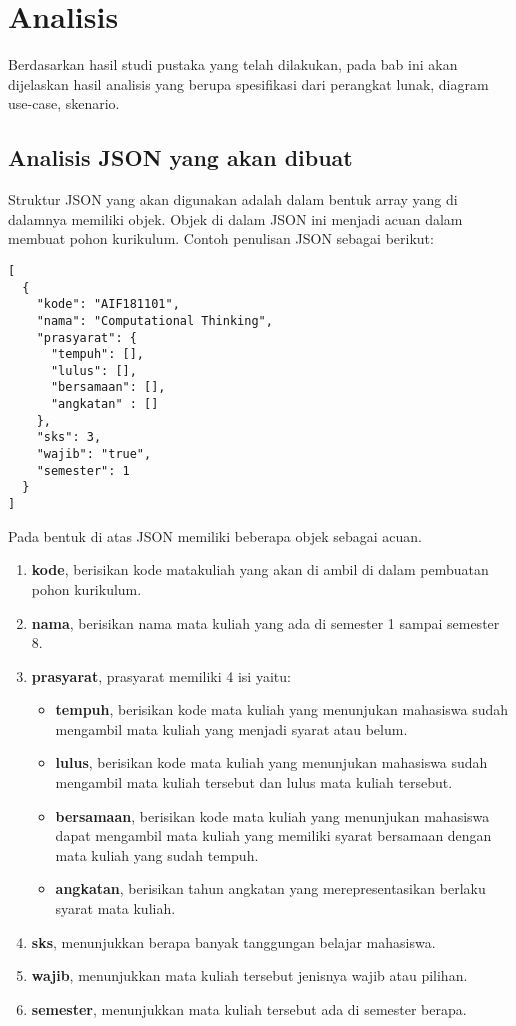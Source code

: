 \chapter{Analisis}
\label{chap: Analsisis}

Berdasarkan hasil studi pustaka yang telah dilakukan, pada bab ini akan dijelaskan hasil analisis
yang berupa spesifikasi dari perangkat lunak, diagram use-case, skenario.

\section{Analisis JSON yang akan dibuat}
\label{sec: Analisis JSON yang akan dibuat}

Struktur JSON yang akan digunakan adalah dalam bentuk array yang di dalamnya memiliki objek.  
Objek di dalam JSON ini menjadi acuan dalam membuat pohon kurikulum. Contoh penulisan JSON sebagai berikut:

\begin{lstlisting}
[
  {
    "kode": "AIF181101",
    "nama": "Computational Thinking",
    "prasyarat": {
      "tempuh": [],
      "lulus": [],
      "bersamaan": [],
      "angkatan" : []
    },
    "sks": 3,
    "wajib": "true",
    "semester": 1
  }
]
\end{lstlisting}

Pada bentuk di atas JSON memiliki beberapa objek sebagai acuan.
\begin{enumerate}
\item \textbf{kode}, berisikan kode matakuliah yang akan di ambil di dalam pembuatan pohon kurikulum.
\item \textbf{nama}, berisikan nama mata kuliah yang ada di semester 1 sampai semester 8.
\item \textbf{prasyarat}, prasyarat memiliki 4 isi yaitu:
\begin{itemize}
\item \textbf{tempuh}, berisikan kode mata kuliah yang menunjukan mahasiswa sudah mengambil mata kuliah yang menjadi syarat atau belum. 
\item \textbf{lulus}, berisikan kode mata kuliah yang menunjukan mahasiswa sudah mengambil mata kuliah tersebut dan lulus mata kuliah tersebut.
\item \textbf{bersamaan}, berisikan kode mata kuliah yang menunjukan mahasiswa dapat mengambil mata kuliah yang memiliki syarat bersamaan dengan mata kuliah yang sudah tempuh.
\item \textbf{angkatan}, berisikan tahun angkatan yang merepresentasikan berlaku syarat mata kuliah.
\end{itemize}
\item \textbf{sks}, menunjukkan berapa banyak tanggungan belajar mahasiswa.
\item \textbf{wajib}, menunjukkan mata kuliah tersebut jenisnya wajib atau pilihan. 
\item \textbf{semester}, menunjukkan mata kuliah tersebut ada di semester berapa.
\end{enumerate}


